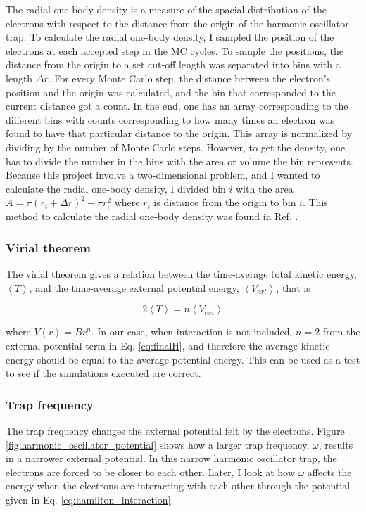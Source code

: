 The radial one-body density is a measure of the spacial distribution of the electrons with respect to the distance from the origin of the harmonic oscillator trap. To calculate the radial one-body density, I sampled the position of the electrons at each accepted step in the MC cycles. To sample the positions, the distance from the origin to a set cut-off length was separated into bins with a length $\Delta r$. For every Monte Carlo step, the distance between the electron's position and the origin was calculated, and the bin that corresponded to the current distance got a count. In the end, one has an array corresponding to the different bins with counts corresponding to how many times an electron was found to have that particular distance to the origin. This array is normalized by dividing by the number of Monte Carlo steps. However, to get the density, one has to divide the number in the bins with the area or volume the bin represents. Because this project involve a two-dimensional problem, and I wanted to calculate the radial one-body density, I divided bin $i$ with the area $ A = \pi (r_i+\Delta r)^2 - \pi r_i^2$ where $r_i$ is distance from the origin to bin $i$. This method to calculate the radial one-body density was found in Ref. \cite{Evens_master}.

\subsubsection{Virial theorem}

The virial theorem gives a relation between the time-average total kinetic energy, $\left<T\right>$, and the time-average external potential energy, $\left<V_{ext}\right>$, that is

\begin{equation}\label{eq:virial_theorem}
2\left< T\right> = n\left< V_{ext}\right>
\end{equation}

where $V(r) = Br^n$. In our case, when interaction is not included, $n = 2$ from the external potential term in Eq. \ref{eq:finalH}, and therefore the average kinetic energy should be equal to the average potential energy. This can be used as a test to see if the simulations executed are correct. 

\subsubsection{Trap frequency}

The trap frequency changes the external potential felt by the electrons. Figure \ref{fig:harmonic_oscillator_potential} shows how a larger trap frequency, $\omega$, results in a narrower external potential. In this narrow harmonic oscillator trap, the electrons are forced to be closer to each other. Later, I look at how $\omega$ affects the energy when the electrons are interacting with each other through the potential given in Eq. \ref{eq:hamilton_interaction}.

